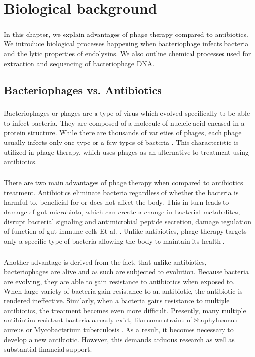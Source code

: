\chapter{Biological background}

\label{kap:background} %
\paragraph*{}
In this chapter, we explain advantages of phage therapy compared to antibiotics. We introduce biological processes happening when bacteriophage infects bacteria and the lytic properties of endolysins. We also outline chemical processes used for extraction and sequencing of bacteriophage DNA.

\section{Bacteriophages vs. Antibiotics}
\paragraph*{}
Bacteriophages or phages are a type of virus which evolved specifically to be able to infect bacteria. They are composed of a molecule of nucleic acid encased in a protein structure. While there are thousands of varieties of phages, each phage usually infects only one type or a few types of bacteria \cite{guttman2005basic}. This characteristic is utilized in phage therapy, which uses phages as an alternative to treatment using antibiotics. 
\paragraph*{}
There are two main advantages of phage therapy \cite{lin2017phage} when compared to antibiotics treatment. Antibiotics eliminate bacteria regardless of whether the bacteria is harmful to, beneficial for or does not affect the body. This in turn leads to damage of gut microbiota, which can create a change in bacterial metabolites, disrupt bacterial signaling and antimicrobial peptide secretion, damage regulation of function of gut immune cells Et al. \cite{zhang2019facing}. Unlike antibiotics, phage therapy targets only a specific type of bacteria allowing the body to maintain its health \cite{lin2017phage}. 
\paragraph*{}
Another advantage is derived from the fact, that unlike antibiotics, bacteriophages are alive and as such are subjected to evolution. Because bacteria are evolving, they are able to gain resistance to antibiotics when exposed to. When large variety of bacteria gain resistance to an antibiotic, the antibiotic is rendered ineffective. Similarly, when a bacteria gains resistance to multiple antibiotics, the treatment becomes even more difficult. Presently, many multiple antibiotics resistant bacteria already exist, like some strains of Staphylococus aureus or Mycobacterium tuberculosis \cite{guilfoile2007antibiotic}. As a result, it becomes necessary to develop a new antibiotic. However, this demands arduous research as well as substantial financial support. 
